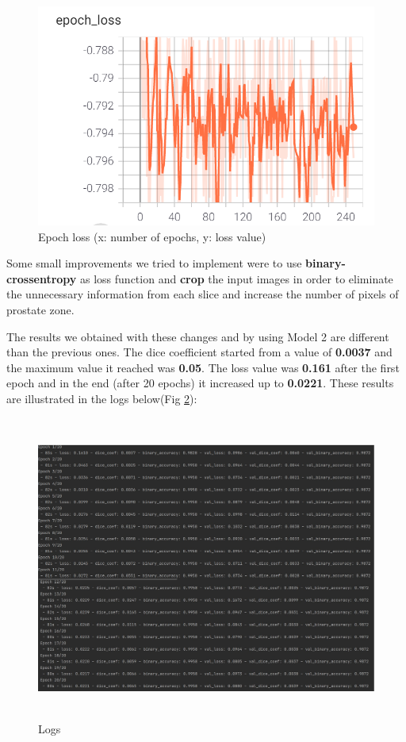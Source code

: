 \documentclass[runningheads,a4paper,11pt]{report}
\begin{document}
\begin{figure}[!h]
	\centerline{\includegraphics{images/epoch_loss_model2.PNG}}
	\caption{Epoch loss (x: number of epochs, y: loss value)}
	\label{epoch_loss_model2}
\end{figure}

\newline
Some small improvements we tried to implement were to use  \textbf{binary-crossentropy} as loss function and  \textbf{crop} the input images in order to eliminate the unnecessary information from each slice and increase the number of pixels of prostate zone.\par
The results we obtained with these changes and by using Model 2 are different than the previous ones. The dice coefficient 
started from a value of \textbf{0.0037} and the maximum value it reached was \textbf{0.05}. The loss value was \textbf{0.161} after the first epoch and in the end (after 20 epochs) it increased up to \textbf{0.0221}. These results are illustrated in the logs below(Fig \ref{logs}):

\begin{figure}[!h]
	\centerline{\includegraphics[width=15cm, height=10cm]{images/logs.jpg}}
	\caption{Logs}
	\label{logs}
\end{figure}
\end{document}
